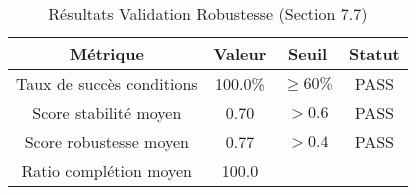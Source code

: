 \begin{table}[h]
\centering
\caption{R\'esultats Validation Robustesse (Section 7.7)}
\begin{tabular}{|c|c|c|c|}
\hline
M\'etrique & Valeur & Seuil & Statut \\
\hline
Taux de succ\`es conditions & 100.0\% & $\geq 60\%$ & PASS \\
Score stabilit\'e moyen & 0.70 & $> 0.6$ & PASS \\
Score robustesse moyen & 0.77 & $> 0.4$ & PASS \\
Ratio compl\'etion moyen & 100.0%
\hline
\end{tabular}
\end{table}
